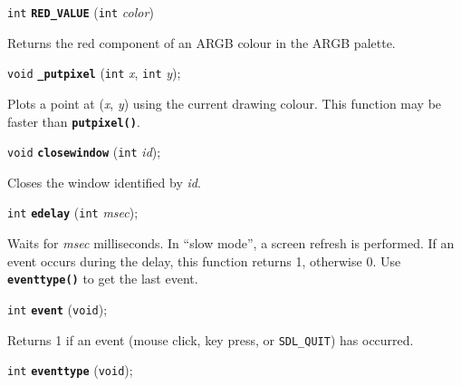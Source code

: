\documentclass[a4paper,12pt]{article}
\newcommand{\V}{\texttt{void}}      %
\newcommand{\I}{\texttt{int}}       %
\newcommand{\func}[1]{\textbf{\texttt{#1}}}  %
\newcommand{\A}[1]{\emph{#1}}       %
\newcommand{\T}[1]{\texttt{#1}}     %
\newenvironment{bgi}
{ %
  \begin{snugshade}
}
{ %
  \end{snugshade}
}
\begin{document}

\label{sec:REDVALUE}

\begin{bgi}
\I{} \func{RED\_VALUE} (\I{} \A{color})
\end{bgi}

Returns the red component of an ARGB colour in the ARGB palette.


\label{sec:pputpixel}

\begin{bgi}
\V{} \func{\_putpixel} (\I{} \A{x}, \I{} \A{y});
\end{bgi}

Plots a point at (\A{x}, \A{y}) using the current drawing colour. This
function may be faster than \func{putpixel()}.


\label{sec:closewindow}

\begin{bgi}
\V{} \func{closewindow} (\I{} \A{id});
\end{bgi}

Closes the window identified by \A{id}.


\begin{bgi}
\I{} \func{edelay} (\I{} \A{msec});
\end{bgi}

Waits for \A{msec} milliseconds. In ``slow mode'', a screen
refresh is performed. If an event occurs during the delay, this
function returns 1, otherwise 0. Use \func{eventtype()} to get the last
event.


\label{sec:event}

\begin{bgi}
\I{} \func{event} (\V{});
\end{bgi}

Returns 1 if an event (mouse click, key press, or \T{SDL\_QUIT}) has
occurred.


\label{sec:eventtype}

\begin{bgi}
\I{} \func{eventtype} (\V{});
\end{bgi}
\end{document}
